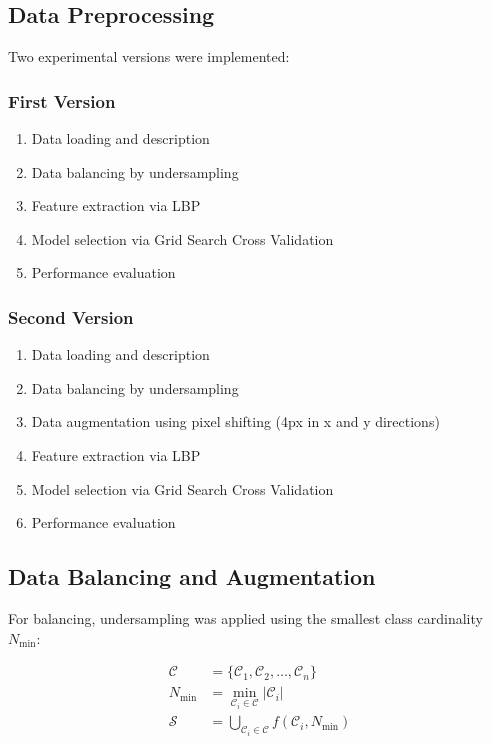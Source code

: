\documentclass[10pt]{article}
\begin{document}
  \subsection{Data Preprocessing}
  Two experimental versions were implemented:
  
  \subsubsection{First Version}
  \begin{enumerate}
    \item Data loading and description
    \item Data balancing by undersampling
    \item Feature extraction via LBP
    \item Model selection via Grid Search Cross Validation
    \item Performance evaluation
  \end{enumerate}

  \subsubsection{Second Version}
  \begin{enumerate}
    \item Data loading and description
    \item Data balancing by undersampling
    \item Data augmentation using pixel shifting (4px in x and y directions)
    \item Feature extraction via LBP
    \item Model selection via Grid Search Cross Validation
    \item Performance evaluation
  \end{enumerate}

  \subsection{Data Balancing and Augmentation}
  For balancing, undersampling was applied using the smallest class cardinality $N_{\min}$:
  
  \begin{equation*}
    \begin{aligned}
      \mathcal{C} &= \{ \mathcal{C}_1, \mathcal{C}_2, \ldots, \mathcal{C}_n \}\\
      N_{\min} &= \min_{\mathcal{C}_i \in \mathcal{C}} |\mathcal{C}_i|\\
      \mathcal{S} &= \bigcup_{\mathcal{C}_i \in \mathcal{C}} f(\mathcal{C}_i, N_{\min})
    \end{aligned}
  \end{equation*}
  
\end{document}
